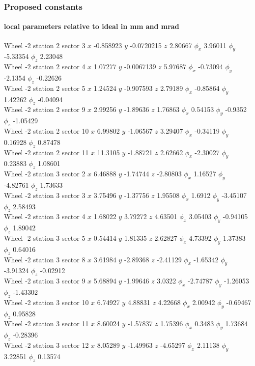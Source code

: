 \documentclass[compress]{beamer}
\begin{document}
\begin{frame}
\frametitle{Proposed constants}
\framesubtitle{local parameters relative to ideal in mm and mrad}

\tiny

Wheel -2 station 2 sector 3 $x$ -0.858923 $y$ -0.0720215 $z$ 2.80667 $\phi_x$ 3.96011 $\phi_y$ -5.33354 $\phi_z$ 2.23048 \\
Wheel -2 station 2 sector 4 $x$ 1.07277 $y$ -0.0067139 $z$ 5.97687 $\phi_x$ -0.73094 $\phi_y$ -2.1354 $\phi_z$ -0.22626 \\
Wheel -2 station 2 sector 5 $x$ 1.24524 $y$ -0.907593 $z$ 2.79189 $\phi_x$ -0.85864 $\phi_y$ 1.42262 $\phi_z$ -0.04094 \\
Wheel -2 station 2 sector 9 $x$ 2.99256 $y$ -1.89636 $z$ 1.76863 $\phi_x$ 0.54153 $\phi_y$ -0.9352 $\phi_z$ -1.05429 \\
Wheel -2 station 2 sector 10 $x$ 6.99802 $y$ -1.06567 $z$ 3.29407 $\phi_x$ -0.34119 $\phi_y$ 0.16928 $\phi_z$ 0.87478 \\
Wheel -2 station 2 sector 11 $x$ 11.3105 $y$ -1.88721 $z$ 2.62662 $\phi_x$ -2.30027 $\phi_y$ 0.23883 $\phi_z$ 1.08601 \\
Wheel -2 station 3 sector 2 $x$ 6.46888 $y$ -1.74744 $z$ -2.80803 $\phi_x$ 1.16527 $\phi_y$ -4.82761 $\phi_z$ 1.73633 \\
Wheel -2 station 3 sector 3 $x$ 3.75496 $y$ -1.37756 $z$ 1.95508 $\phi_x$ 1.6912 $\phi_y$ -3.45107 $\phi_z$ 2.58493 \\
Wheel -2 station 3 sector 4 $x$ 1.68022 $y$ 3.79272 $z$ 4.63501 $\phi_x$ 3.05403 $\phi_y$ -0.94105 $\phi_z$ 1.89042 \\
Wheel -2 station 3 sector 5 $x$ 0.54414 $y$ 1.81335 $z$ 2.62827 $\phi_x$ 4.73392 $\phi_y$ 1.37383 $\phi_z$ 0.64016 \\
Wheel -2 station 3 sector 8 $x$ 3.61984 $y$ -2.89368 $z$ -2.41129 $\phi_x$ -1.65342 $\phi_y$ -3.91324 $\phi_z$ -0.02912 \\
Wheel -2 station 3 sector 9 $x$ 5.68894 $y$ -1.99646 $z$ 3.0322 $\phi_x$ -2.74787 $\phi_y$ -1.26053 $\phi_z$ -1.43302 \\
Wheel -2 station 3 sector 10 $x$ 6.74927 $y$ 4.88831 $z$ 4.22668 $\phi_x$ 2.00942 $\phi_y$ -0.69467 $\phi_z$ 0.95828 \\
Wheel -2 station 3 sector 11 $x$ 8.60024 $y$ -1.57837 $z$ 1.75396 $\phi_x$ 0.3483 $\phi_y$ 1.73684 $\phi_z$ -0.28396 \\
Wheel -2 station 3 sector 12 $x$ 8.05289 $y$ -1.49963 $z$ -4.65297 $\phi_x$ 2.11138 $\phi_y$ 3.22851 $\phi_z$ 0.13574 \\

\end{frame}
\end{document}
